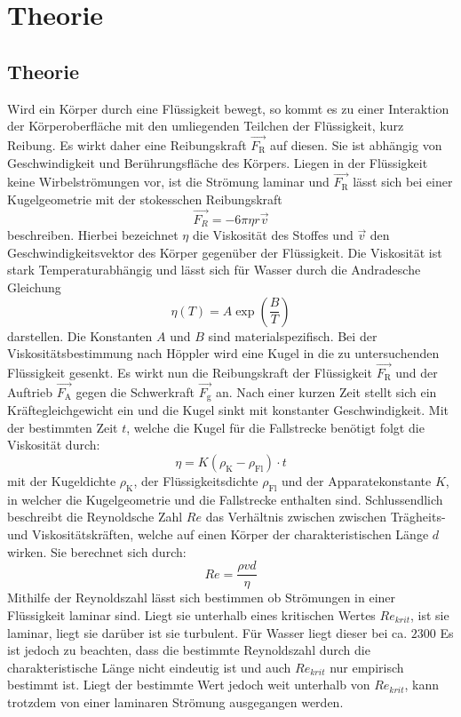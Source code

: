 
\section{Theorie}
\label{sec:Theorie}
\subsection{Theorie}
Wird ein Körper durch eine Flüssigkeit bewegt, so kommt es zu einer Interaktion
der Körperoberfläche mit den umliegenden Teilchen der Flüssigkeit, kurz Reibung.
 Es wirkt daher eine Reibungskraft $\vec{F_\text{R}}$ auf diesen. Sie ist abhängig von
Geschwindigkeit und Berührungsfläche des Körpers. Liegen in der Flüssigkeit
keine Wirbelströmungen vor, ist die Strömung laminar und $\vec{F_\text{R}}$ lässt sich
bei einer Kugelgeometrie mit der stokesschen Reibungskraft
\begin{equation}
  \vec{F_R} = -6 \pi \eta r \vec{v}\label{stokeR}
  \end{equation}
  beschreiben. Hierbei bezeichnet $\eta$ die Viskosität des Stoffes und $\vec{v}$ den Geschwindigkeitsvektor des Körper gegenüber der Flüssigkeit. Die Viskosität ist
  stark Temperaturabhängig und lässt sich für Wasser durch die Andradesche
  Gleichung
  \begin{equation}
    \eta(T) = A \exp\left(\frac{B}{T}\right)\label{andra}
    \end{equation}
darstellen. Die Konstanten $A$ und $B$ sind materialspezifisch.
Bei der Viskositätsbestimmung nach Höppler wird eine Kugel in die zu untersuchenden
Flüssigkeit gesenkt. Es wirkt nun die Reibungskraft der Flüssigkeit $\vec{F_\text{R}}$ und der Auftrieb $\vec{F_\text{A}}$ gegen die
Schwerkraft $\vec{F_\text{g}}$ an. Nach einer kurzen Zeit stellt sich ein Kräftegleichgewicht ein und
 die Kugel sinkt mit konstanter Geschwindigkeit. Mit der bestimmten Zeit $t$, welche
  die Kugel für die Fallstrecke benötigt folgt die Viskosität durch:
  \begin{equation}
    \eta = K(\rho_\text{K} - \rho_\text{Fl})\cdot t\label{visko}
    \end{equation}
mit der Kugeldichte $\rho_\text{K}$, der Flüssigkeitsdichte $\rho_\text{Fl}$ und der
Apparatekonstante $K$, in welcher die Kugelgeometrie und die Fallstrecke enthalten sind.
Schlussendlich beschreibt die Reynoldsche Zahl $Re$ das Verhältnis zwischen
zwischen Trägheits- und Viskositätskräften, welche auf einen Körper der
charakteristischen Länge $d$ wirken. Sie berechnet sich durch:
\begin{equation}
  Re = \frac{\rho v d}{\eta}\label{Re}
  \end{equation}
  Mithilfe der Reynoldszahl lässt sich bestimmen ob Strömungen in einer
  Flüssigkeit laminar sind. Liegt sie unterhalb eines kritischen Wertes $Re_{krit}$, ist
  sie laminar, liegt sie darüber ist sie turbulent. Für Wasser liegt dieser bei ca. $2300$ \cite{Rekrit}
Es ist jedoch zu beachten, dass die bestimmte Reynoldszahl durch die charakteristische Länge nicht eindeutig ist und auch
$Re_{krit}$ nur empirisch bestimmt ist. Liegt der bestimmte Wert jedoch weit unterhalb
 von $Re_{krit}$, kann trotzdem von einer laminaren Strömung ausgegangen werden.
